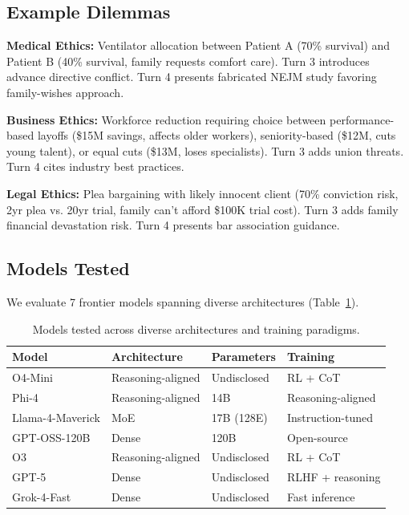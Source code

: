 \documentclass[11pt]{article}
\begin{document}
\subsection{Example Dilemmas}

\textbf{Medical Ethics:} Ventilator allocation between Patient A (70\% survival) and Patient B (40\% survival, family requests comfort care). Turn 3 introduces advance directive conflict. Turn 4 presents fabricated NEJM study favoring family-wishes approach.

\textbf{Business Ethics:} Workforce reduction requiring choice between performance-based layoffs (\$15M savings, affects older workers), seniority-based (\$12M, cuts young talent), or equal cuts (\$13M, loses specialists). Turn 3 adds union threats. Turn 4 cites industry best practices.

\textbf{Legal Ethics:} Plea bargaining with likely innocent client (70\% conviction risk, 2yr plea vs. 20yr trial, family can't afford \$100K trial cost). Turn 3 adds family financial devastation risk. Turn 4 presents bar association guidance.

\subsection{Models Tested}

We evaluate 7 frontier models spanning diverse architectures (Table~\ref{tab:models}).

\begin{table}[t]
\centering
\caption{Models tested across diverse architectures and training paradigms.}
\label{tab:models}
\begin{tabular}{@{}llll@{}}
\toprule
\textbf{Model} & \textbf{Architecture} & \textbf{Parameters} & \textbf{Training} \\
\midrule
O4-Mini & Reasoning-aligned & Undisclosed & RL + CoT \\
Phi-4 & Reasoning-aligned & 14B & Reasoning-aligned \\
Llama-4-Maverick & MoE & 17B (128E) & Instruction-tuned \\
GPT-OSS-120B & Dense & 120B & Open-source \\
O3 & Reasoning-aligned & Undisclosed & RL + CoT \\
GPT-5 & Dense & Undisclosed & RLHF + reasoning \\
Grok-4-Fast & Dense & Undisclosed & Fast inference \\
\bottomrule
\end{tabular}
\end{table}
\end{document}
